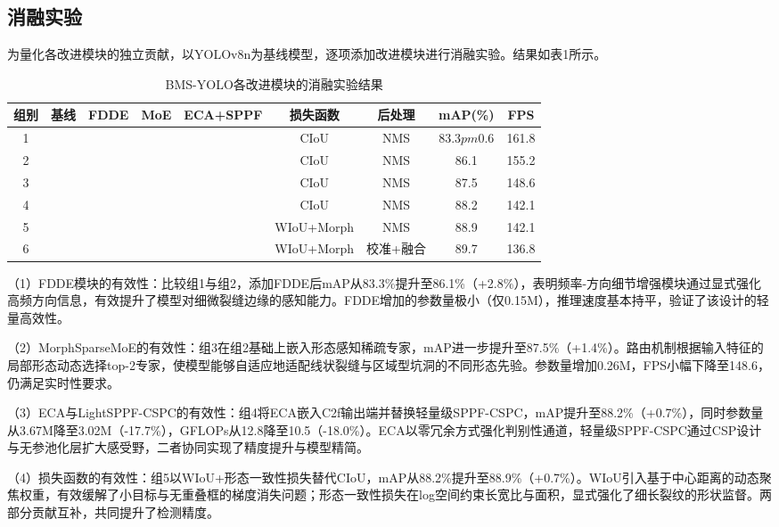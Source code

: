 \documentclass[twocolumn]{sn-jnl}
\begin{document}
	\subsection{消融实验}
	为量化各改进模块的独立贡献，以YOLOv8n为基线模型，逐项添加改进模块进行消融实验。结果如表1所示。
	
	\begin{table}[htbp]
		\centering
		\caption{BMS-YOLO各改进模块的消融实验结果}
		\begin{tabular}{ccccccccc}
			\toprule
			组别 & 基线 & FDDE & MoE & ECA+SPPF & 损失函数 & 后处理 & mAP(\%) & FPS \\
			\midrule
			1 & \checkmark & & & & CIoU & NMS & 83.3$pm$0.6 & 161.8 \\
			2 & \checkmark & \checkmark & & & CIoU & NMS & 86.1 & 155.2 \\
			3 & \checkmark & \checkmark & \checkmark & & CIoU & NMS & 87.5 & 148.6 \\
			4 & \checkmark & \checkmark & \checkmark & \checkmark & CIoU & NMS & 88.2 & 142.1 \\
			5 & \checkmark & \checkmark & \checkmark & \checkmark & WIoU+Morph & NMS & 88.9 & 142.1 \\
			6 & \checkmark & \checkmark & \checkmark & \checkmark & WIoU+Morph & 校准+融合 & 89.7 & 136.8 \\
			\bottomrule
		\end{tabular}
		\label{tab:ablation}
	\end{table}
	
	（1）FDDE模块的有效性：比较组1与组2，添加FDDE后mAP从83.3\%提升至86.1\%（+2.8\%），表明频率-方向细节增强模块通过显式强化高频方向信息，有效提升了模型对细微裂缝边缘的感知能力。FDDE增加的参数量极小（仅0.15M），推理速度基本持平，验证了该设计的轻量高效性。
	
	（2）MorphSparseMoE的有效性：组3在组2基础上嵌入形态感知稀疏专家，mAP进一步提升至87.5\%（+1.4\%）。路由机制根据输入特征的局部形态动态选择top-2专家，使模型能够自适应地适配线状裂缝与区域型坑洞的不同形态先验。参数量增加0.26M，FPS小幅下降至148.6，仍满足实时性要求。
	
	（3）ECA与LightSPPF-CSPC的有效性：组4将ECA嵌入C2f输出端并替换轻量级SPPF-CSPC，mAP提升至88.2\%（+0.7\%），同时参数量从3.67M降至3.02M（-17.7\%），GFLOPs从12.8降至10.5（-18.0\%）。ECA以零冗余方式强化判别性通道，轻量级SPPF-CSPC通过CSP设计与无参池化层扩大感受野，二者协同实现了精度提升与模型精简。
	
	（4）损失函数的有效性：组5以WIoU+形态一致性损失替代CIoU，mAP从88.2\%提升至88.9\%（+0.7\%）。WIoU引入基于中心距离的动态聚焦权重，有效缓解了小目标与无重叠框的梯度消失问题；形态一致性损失在log空间约束长宽比与面积，显式强化了细长裂纹的形状监督。两部分贡献互补，共同提升了检测精度。
	
\end{document}
